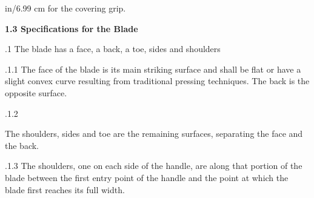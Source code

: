 \documentclass[12pt]{article}
\begin{document}
\vspace{\baselineskip}
\begin{adjustwidth}{0.5in}{0.0in}
{\fontsize{9pt}{10.8pt} in/6.99 cm for the covering grip.\par}\par

\end{adjustwidth}


\vspace{\baselineskip}
{\fontsize{11pt}{13.2pt}\selectfont \textbf{1.3 \tabto{0.47in} Specifications for the Blade}\par}\par


\vspace{\baselineskip}
{\fontsize{9pt}{10.8pt}.1 \tabto{0.49in} The blade has a face, a back, a toe, sides and shoulders\par}\par


\vspace{\baselineskip}
\begin{adjustwidth}{1.18in}{0.12in}
{\fontsize{9pt}{10.8pt}.1.1 \tabto{1.17in} The face of the blade is its main striking surface and shall be flat or have a slight convex curve resulting from traditional pressing techniques. The back is the opposite surface.\par}\par

\end{adjustwidth}


\vspace{\baselineskip}
\begin{adjustwidth}{0.49in}{0.0in}
{\fontsize{9pt}{10.8pt}.1.2 \tabto{1.17in} {\fontsize{8pt}{9.6pt}\selectfont The shoulders, sides and toe are the remaining surfaces, separating the face and the back.\par}\par}\par

\end{adjustwidth}


\vspace{\baselineskip}
\begin{adjustwidth}{1.18in}{0.1in}
{\fontsize{9pt}{10.8pt}.1.3 \tabto{1.17in} The shoulders, one on each side of the handle, are along that portion of the blade between the first entry point of the handle and the point at which the blade first reaches its full width.\par}\par

\end{adjustwidth}
\end{document}
